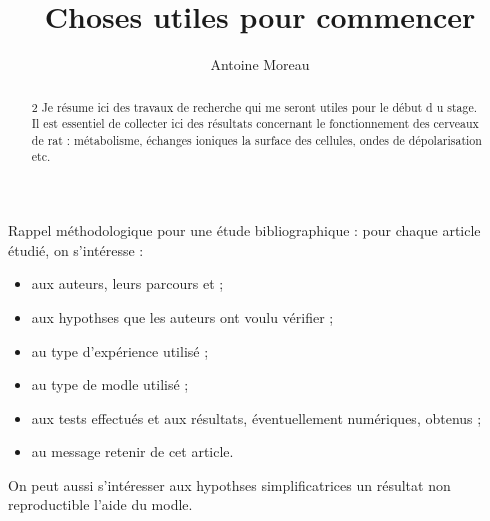 \documentclass[a4paper,12pt]{article}
\title{Choses utiles pour commencer}
\author{Antoine Moreau}
\begin{document}

\maketitle

\begin{abstract}2
Je r\'esume ici des travaux de recherche qui me seront utiles pour le d\'ebut d u stage. %
Il est essentiel de collecter ici des résultats concernant le fonctionnement des cerveaux de rat : %
m\'etabolisme, \'echanges ioniques  la surface des cellules, ondes de d\'epolarisation etc.
\end{abstract}

Rappel m\'ethodologique pour une \'etude bibliographique : pour chaque article \'etudi\'e, on s'int\'eresse :

\begin{itemize}
\item aux auteurs, leurs parcours et ;
\item aux hypothses que les auteurs ont voulu v\'erifier ;
\item au type d'exp\'erience utilis\'e ;
\item au type de modle utilis\'e ;
\item aux tests effectu\'es et aux r\'esultats, \'eventuellement num\'eriques, obtenus ;
\item au message  retenir de cet article.
\end{itemize}

On peut aussi s'int\'eresser aux hypothses simplificatrices  un r\'esultat non reproductible  l'aide du modle.

\newpage

\newpage

\newpage








\newpage


\end{document}
